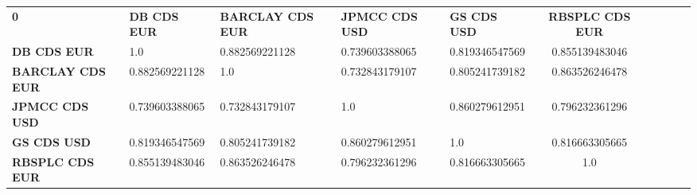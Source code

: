 \begin{center}
 \begin{tabular}{|l|l|l|l|l|c|c|c|c|c|}
\hline
\textbf{0} & \textbf{DB CDS EUR} & \textbf{BARCLAY CDS EUR} & \textbf{JPMCC CDS USD} & \textbf{GS CDS USD} & \textbf{RBSPLC CDS EUR}\\\hhline{|=|=|=|=|=|=|}
\textbf{DB CDS EUR} & 1.0 & 0.882569221128 & 0.739603388065 & 0.819346547569 & 0.855139483046\\
\textbf{BARCLAY CDS EUR} & 0.882569221128 & 1.0 & 0.732843179107 & 0.805241739182 & 0.863526246478\\
\textbf{JPMCC CDS USD} & 0.739603388065 & 0.732843179107 & 1.0 & 0.860279612951 & 0.796232361296\\
\textbf{GS CDS USD} & 0.819346547569 & 0.805241739182 & 0.860279612951 & 1.0 & 0.816663305665\\
\textbf{RBSPLC CDS EUR} & 0.855139483046 & 0.863526246478 & 0.796232361296 & 0.816663305665 & 1.0\\
\hline
\end{tabular}
\end{center}